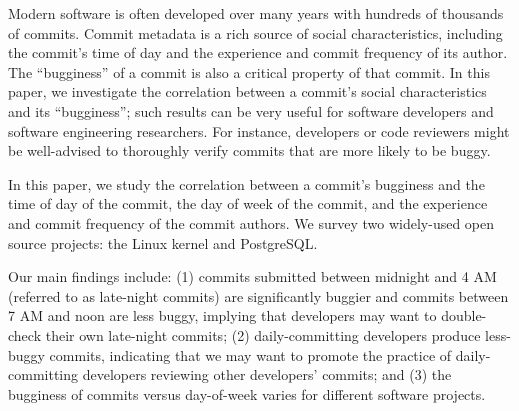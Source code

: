 Modern software is often developed over many years with hundreds of thousands of
commits. Commit metadata is a rich source of social characteristics, including
the commit's time of day and the experience and commit frequency of its author.
The ``bugginess'' of a commit is also a critical property of that commit. In
this paper, we investigate the correlation between a commit's social
characteristics and its ``bugginess''; such results can be very useful for
software developers and software engineering researchers. For instance,
developers or code reviewers might be well-advised to thoroughly verify commits
that are more likely to be buggy.

In this paper, we study the correlation between a commit's bugginess and the
time of day of the commit, the day of week of the commit, and the experience and
commit frequency of the commit authors.  We survey two widely-used open source
projects: the Linux kernel and PostgreSQL.

Our main findings include: (1) commits submitted between midnight and 4 AM
(referred to as late-night commits) are significantly buggier and commits
between 7 AM and noon are less buggy, implying that developers may want to
double-check their own late-night commits; (2) daily-committing developers
produce less-buggy commits, indicating that we may want to promote the practice
of daily-committing developers reviewing other developers' commits; and (3) the
bugginess of commits versus day-of-week varies for different software projects.
